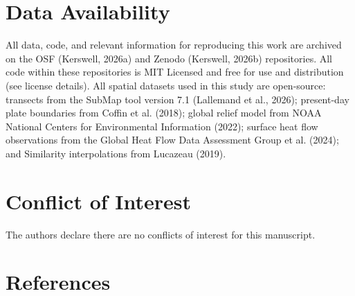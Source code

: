 \documentclass[draft,linenumbers]{agujournal2019}
\begin{document}
\section*{Data Availability}\label{sec:data-availability}

All data, code, and relevant information for reproducing this work are
archived on the OSF (Kerswell, 2026a) and Zenodo (Kerswell, 2026b)
repositories. All code within these repositories is MIT Licensed and
free for use and distribution (see license details). All spatial
datasets used in this study are open-source: transects from the SubMap
tool version 7.1 ({Lallemand et al.}, 2026); present-day plate
boundaries from Coffin et al. (2018); global relief model from NOAA
National Centers for Environmental Information (2022); surface heat flow
observations from the Global Heat Flow Data Assessment Group et al.
(2024); and Similarity interpolations from Lucazeau (2019).

\section*{Conflict of Interest}\label{sec:conflict-of-interest}

The authors declare there are no conflicts of interest for this
manuscript.

\clearpage

\section*{References}\label{sec:references}
\end{document}
